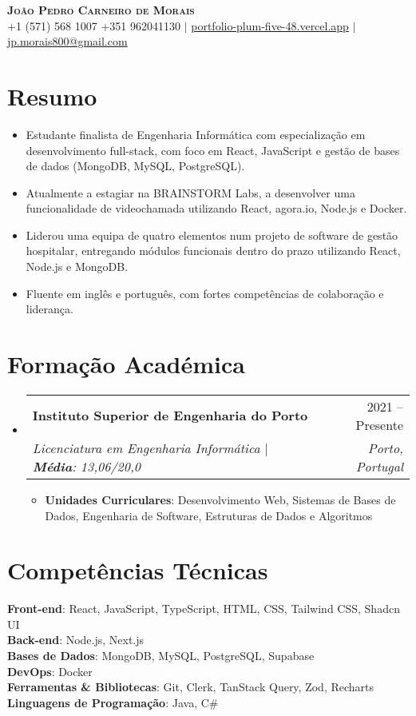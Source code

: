 \documentclass[letterpaper,11pt]{article}
\makeatletter
\newcommand{\resumeItem}[1]{\item\small{#1 \vspace{-2pt}}}
\newcommand{\resumeSubheading}[4]{
  \vspace{-2pt}\item
    \begin{tabular*}{0.97\textwidth}[t]{l@{\extracolsep{\fill}}r}
      \textbf{#1} & #2 \\
      \textit{\small#3} & \textit{\small #4} \\
    \end{tabular*}\vspace{-7pt}
}
\newcommand{\resumeSubHeadingListStart}{\begin{itemize}[leftmargin=0.15in, label={}]}
\newcommand{\resumeSubHeadingListEnd}{\end{itemize}}
\newcommand{\resumeItemListStart}{\begin{itemize}}
\newcommand{\resumeItemListEnd}{\end{itemize}\vspace{-5pt}}
\makeatother
\begin{document}
\begin{center}
    \textbf{\Huge \scshape João Pedro Carneiro de Morais} \\ \vspace{1pt}
    \small +1 (571) 568 1007  +351 962041130 $|$ \href{https://portfolio-plum-five-48.vercel.app/}{portfolio-plum-five-48.vercel.app} $|$ \href{mailto:jp.morais800@gmail.com}{jp.morais800@gmail.com}
\end{center}

\section{Resumo}
  \resumeItemListStart
    \resumeItem{Estudante finalista de Engenharia Informática com especialização em desenvolvimento full-stack, com foco em React, JavaScript e gestão de bases de dados (MongoDB, MySQL, PostgreSQL).}
    \resumeItem{Atualmente a estagiar na BRAINSTORM Labs, a desenvolver uma funcionalidade de videochamada utilizando React, agora.io, Node.js e Docker.}
    \resumeItem{Liderou uma equipa de quatro elementos num projeto de software de gestão hospitalar, entregando módulos funcionais dentro do prazo utilizando React, Node.js e MongoDB.}
    \resumeItem{Fluente em inglês e português, com fortes competências de colaboração e liderança.}
  \resumeItemListEnd

\section{Formação Académica}
  \resumeSubHeadingListStart
    \resumeSubheading
      {Instituto Superior de Engenharia do Porto}{2021 -- Presente}
      {Licenciatura em Engenharia Informática $|$ \textbf{Média}: 13,06/20,0}
      {Porto, Portugal}
      \resumeItemListStart
        \resumeItem{\textbf{Unidades Curriculares}: Desenvolvimento Web, Sistemas de Bases de Dados, Engenharia de Software, Estruturas de Dados e Algoritmos}
      \resumeItemListEnd
  \resumeSubHeadingListEnd

\section{Competências Técnicas}
 \begin{itemize}[leftmargin=0.15in, label={}]
    \small{\item{
    {\textbf{Front-end}: React, JavaScript, TypeScript, HTML, CSS, Tailwind CSS, Shadcn UI}\\
    {\textbf{Back-end}: Node.js, Next.js}\\
    {\textbf{Bases de Dados}: MongoDB, MySQL, PostgreSQL, Supabase}\\
    {\textbf{DevOps}: Docker}\\
    {\textbf{Ferramentas \& Bibliotecas}: Git, Clerk, TanStack Query, Zod, Recharts}\\
    {\textbf{Linguagens de Programação}: Java, C\#}}}
\end{itemize}
\end{document}
